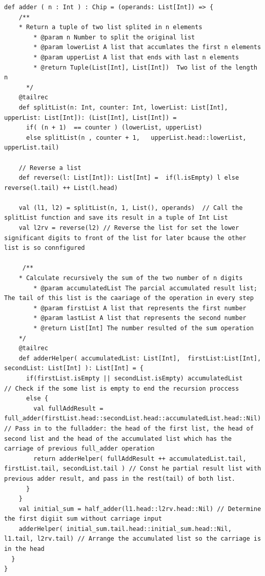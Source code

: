 \documentclass[12pt, a4paper]{article}
\begin{document}
\begin{lstlisting}[style=scalaStyle, caption=Aplica una operación binaria sobre una valor de entrada.]
   def adder ( n : Int ) : Chip = (operands: List[Int]) => {
    /**
    * Return a tuple of two list splited in n elements 
        * @param n Number to split the original list
        * @param lowerList A list that accumlates the first n elements
        * @param upperList A list that ends with last n elements
        * @return Tuple(List[Int], List[Int])  Two list of the length n
      */
    @tailrec
    def splitList(n: Int, counter: Int, lowerList: List[Int], upperList: List[Int]): (List[Int], List[Int]) =
      if( (n + 1)  == counter ) (lowerList, upperList)
      else splitList(n , counter + 1,   upperList.head::lowerList, upperList.tail)

    // Reverse a list
    def reverse(l: List[Int]): List[Int] =  if(l.isEmpty) l else reverse(l.tail) ++ List(l.head)

    val (l1, l2) = splitList(n, 1, List(), operands)  // Call the splitList function and save its result in a tuple of Int List
    val l2rv = reverse(l2) // Reverse the list for set the lower significant digits to front of the list for later bcause the other list is so connfigured
   
     /**
    * Calculate recursively the sum of the two number of n digits 
        * @param accumulatedList The parcial accumulated result list; The tail of this list is the caariage of the operation in every step
        * @param firstList A list that represents the first number
        * @param lastList A list that represents the second number
        * @return List[Int] The number resulted of the sum operation
    */
    @tailrec
    def adderHelper( accumulatedList: List[Int],  firstList:List[Int],  secondList: List[Int] ): List[Int] = {
      if(firstList.isEmpty || secondList.isEmpty) accumulatedList     // Check if the some list is empty to end the recursion proccess
      else {
        val fullAddResult = full_adder(firstList.head::secondList.head::accumulatedList.head::Nil) // Pass in to the fulladder: the head of the first list, the head of second list and the head of the accumulated list which has the carriage of previous full_adder operation
        return adderHelper( fullAddResult ++ accumulatedList.tail, firstList.tail, secondList.tail ) // Const he partial result list with previous adder result, and pass in the rest(tail) of both list.
      }
    }
    val initial_sum = half_adder(l1.head::l2rv.head::Nil) // Determine the first digiit sum without carriage input
    adderHelper( initial_sum.tail.head::initial_sum.head::Nil, l1.tail, l2rv.tail) // Arrange the accumulated list so the carriage is in the head
  }
}
\end{lstlisting}
\end{document}
